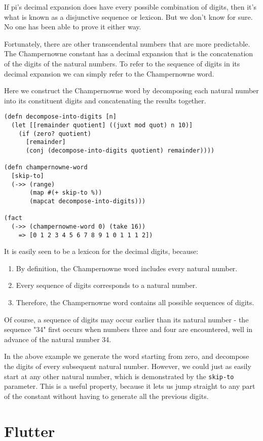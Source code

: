 \documentclass[numbers]{sigplanconf}
\begin{document}
If pi's decimal expansion does have every possible combination of digits, then it's what is known as a disjunctive
sequence or lexicon. But we don't know for sure. No one has been able to prove it either way.

Fortunately, there are other transcendental numbers that are more predictable. The Champernowne constant has a
decimal expansion that is the concatenation of the digits of the natural numbers. To refer to the sequence of digits
in its decimal expansion we can simply refer to the Champernowne word.

Here we construct the Champernowne word by decomposing each natural number into its constituent digits and concatenating
the results together.

\begin{verbatim}
(defn decompose-into-digits [n]
  (let [[remainder quotient] ((juxt mod quot) n 10)]
    (if (zero? quotient)
      [remainder]
      (conj (decompose-into-digits quotient) remainder))))

(defn champernowne-word
  [skip-to]
  (->> (range)
       (map #(+ skip-to %))
       (mapcat decompose-into-digits)))

(fact
  (->> (champernowne-word 0) (take 16))
    => [0 1 2 3 4 5 6 7 8 9 1 0 1 1 1 2])
\end{verbatim}

It is easily seen to be a lexicon for the decimal digits, because:
\begin{enumerate}
    \item By definition, the Champernowne word includes every natural number.
    \item Every sequence of digits corresponds to a natural number.
    \item Therefore, the Champernowne word contains all possible sequences of digits.
\end{enumerate}
Of course, a sequence of digits may occur earlier than its natural number - the sequence "34" first occurs when numbers three and
four are encountered, well in advance of the natural number 34.

In the above example we generate the word starting from zero, and decompose the digits of
every subsequent natural number. However, we could just as easily start at any other natural number, which is demonstrated
by the \verb|skip-to| parameter. This is a useful property, because it lets us jump straight to any part of the constant
without having to generate all the previous digits.

\section{Flutter}
\end{document}
